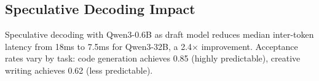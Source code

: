 \subsection{Speculative Decoding Impact}

Speculative decoding with Qwen3-0.6B as draft model reduces median inter-token
latency from 18ms to 7.5ms for Qwen3-32B, a 2.4$\times$ improvement.
Acceptance rates vary by task: code generation achieves 0.85 (highly
predictable), creative writing achieves 0.62 (less predictable).


